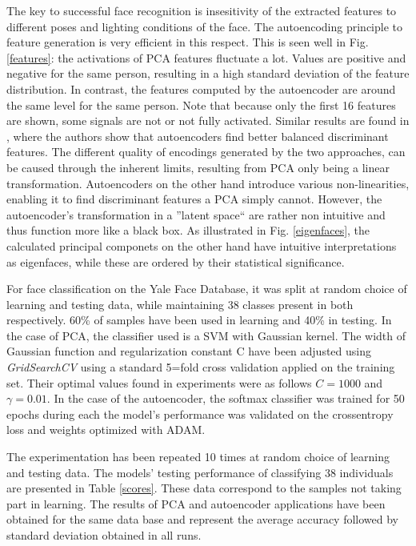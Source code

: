 The key to successful face recognition is insesitivity of the extracted features
to different poses and lighting conditions of the face. The autoencoding
principle to feature generation is very efficient in this respect. This is seen
well in Fig. \ref{features}: the activations of PCA features fluctuate a lot.
Values are positive and negative for the same person, resulting in a high
standard deviation of the feature distribution. In contrast, the features
computed by the autoencoder are around the same level for the same person. Note
that because only the first 16 features are shown, some signals are not or not
fully activated. Similar results are found in \cite{siwek2017autoencoder}, where
the authors show that autoencoders find better balanced discriminant features.
The different quality of encodings generated by the two approaches, can be
caused through the inherent limits, resulting from PCA only being a linear
transformation. Autoencoders on the other hand introduce various
non-linearities, enabling it to find discriminant features a PCA simply cannot.
However, the autoencoder's transformation in a ''latent space`` are rather non
intuitive and thus function more like a black box. As illustrated in Fig.
\ref{eigenfaces}, the calculated principal componets on the other hand have
intuitive interpretations as eigenfaces, while these are ordered by their
statistical significance.

For face classification on the Yale Face Database, it was split at random choice
of learning and testing data, while maintaining 38 classes present in both
respectively. 60\% of samples have been used in learning and 40\% in testing. In
the case of PCA, the classifier used is a SVM with Gaussian kernel. The width of
Gaussian function and regularization constant C have been adjusted using
\textit{GridSearchCV} using a standard 5=fold cross validation applied on the
training set. Their optimal values found in experiments were as follows $C=1000$
and $\gamma=0.01$. In the case of the autoencoder, the softmax classifier was
trained for 50 epochs during each the model's performance was validated on the
crossentropy loss and weights optimized with ADAM.

The experimentation has been repeated 10 times at random choice of learning and
testing data. The models' testing performance of classifying 38 individuals 
are presented in Table \ref{scores}. These data correspond to the samples not 
taking part in learning. The results of PCA and autoencoder applications have 
been obtained for the same data base \cite{yalefaceB}\cite{yalefaceBcropped} and
represent the average accuracy followed by standard deviation obtained in all 
runs.

